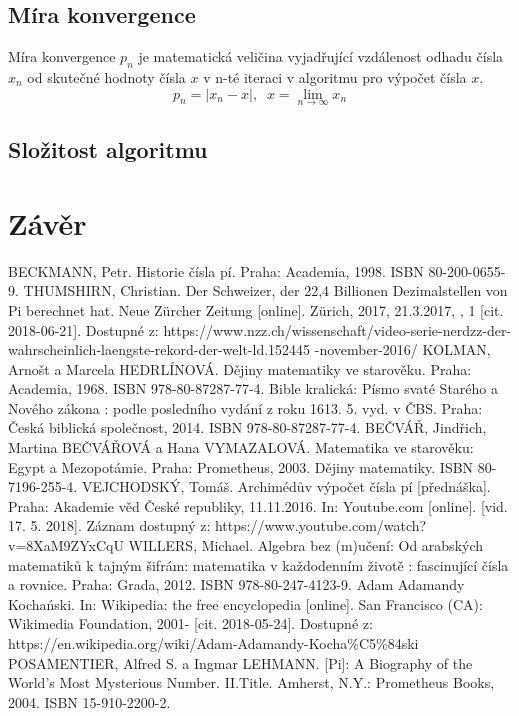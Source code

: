 \documentclass[rocnikovka]{gzwroc} %
\begin{document}
\subsection{Míra konvergence}
Míra konvergence $p_n$ je matematická veličina vyjadřující vzdálenost odhadu čísla $x_n$ od skutečné hodnoty čísla $x$ v n-té iteraci v algoritmu pro výpočet čísla $x$.
$$
p_n=|x_n-x|, \;\; x=\lim_{n\to\infty} x_n
$$
\subsection{Složitost algoritmu}
\section{Závěr}
\newpage
\begin{oldthebibliography}{99}
BECKMANN, Petr. Historie čísla pí. Praha: Academia, 1998. ISBN 80-200-0655-9.
THUMSHIRN, Christian. Der Schweizer, der 22,4 Billionen Dezimalstellen von Pi berechnet hat. Neue Zürcher Zeitung [online]. Zürich, 2017, 21.3.2017, , 1 [cit. 2018-06-21]. Dostupné z: https://www.nzz.ch/wissenschaft/video-serie-nerdzz-der-wahrscheinlich-laengste-rekord-der-welt-ld.152445
-november-2016/
KOLMAN, Arnošt a Marcela HEDRLÍNOVÁ. Dějiny matematiky ve starověku. Praha: Academia, 1968. ISBN 978-80-87287-77-4.
Bible kralická: Písmo svaté Starého a Nového zákona : podle posledního vydání z roku 1613. 5. vyd. v ČBS. Praha: Česká biblická společnost, 2014. ISBN 978-80-87287-77-4.
BEČVÁŘ, Jindřich, Martina BEČVÁŘOVÁ a Hana VYMAZALOVÁ. Matematika ve starověku: Egypt a Mezopotámie. Praha: Prometheus, 2003. Dějiny matematiky. ISBN 80-7196-255-4.
VEJCHODSKÝ, Tomáš. Archimédův výpočet čísla pí [přednáška]. Praha: Akademie věd České republiky, 11.11.2016. In: Youtube.com [online]. [vid. 17. 5. 2018]. Záznam dostupný z: https://www.youtube.com/watch?v=8XaM9ZYxCqU
WILLERS, Michael. Algebra bez (m)učení: Od arabských matematiků k tajným šifrám: matematika v každodenním životě : fascinující čísla a rovnice. Praha: Grada, 2012. ISBN 978-80-247-4123-9.
Adam Adamandy Kochański. In: Wikipedia: the free encyclopedia [online]. San Francisco (CA): Wikimedia Foundation, 2001- [cit. 2018-05-24]. Dostupné z: https://en.wikipedia.org/wiki/Adam-Adamandy-Kocha\%C5\%84ski
POSAMENTIER, Alfred S. a Ingmar LEHMANN. [Pi]: A Biography of the World's Most Mysterious Number. II.Title. Amherst, N.Y.: Prometheus Books, 2004. ISBN 15-910-2200-2.

\end{oldthebibliography}
\end{document}
